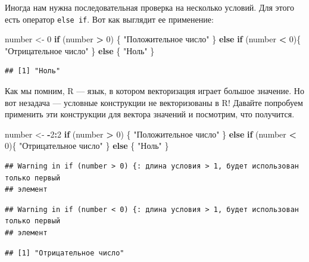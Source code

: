 \documentclass[]{book}
\newenvironment{Shaded}{\begin{snugshade}}{\end{snugshade}}
\newcommand{\DecValTok}[1]{\textcolor[rgb]{0.00,0.00,0.81}{#1}}
\newcommand{\StringTok}[1]{\textcolor[rgb]{0.31,0.60,0.02}{#1}}
\newcommand{\ControlFlowTok}[1]{\textcolor[rgb]{0.13,0.29,0.53}{\textbf{#1}}}
\newcommand{\OperatorTok}[1]{\textcolor[rgb]{0.81,0.36,0.00}{\textbf{#1}}}
\newcommand{\NormalTok}[1]{#1}
\begin{document}
Иногда нам нужна последовательная проверка на несколько условий. Для
этого есть оператор \texttt{else\ if}. Вот как выглядит ее применение:

\begin{Shaded}
\begin{Highlighting}[]
\NormalTok{number <-}\StringTok{ }\DecValTok{0}
\ControlFlowTok{if}\NormalTok{ (number }\OperatorTok{>}\StringTok{ }\DecValTok{0}\NormalTok{) \{}
  \StringTok{"Положительное число"}
\NormalTok{\} }\ControlFlowTok{else} \ControlFlowTok{if}\NormalTok{ (number }\OperatorTok{<}\StringTok{ }\DecValTok{0}\NormalTok{)\{}
  \StringTok{"Отрицательное число"}
\NormalTok{\} }\ControlFlowTok{else}\NormalTok{ \{}
  \StringTok{"Ноль"}
\NormalTok{\}}
\end{Highlighting}
\end{Shaded}

\begin{verbatim}
## [1] "Ноль"
\end{verbatim}

Как мы помним, R --- язык, в котором векторизация играет большое
значение. Но вот незадача --- условные конструкции не векторизованы в R!
Давайте попробуем применить эти конструкции для вектора значений и
посмотрим, что получится.

\begin{Shaded}
\begin{Highlighting}[]
\NormalTok{number <-}\StringTok{ }\OperatorTok{-}\DecValTok{2}\OperatorTok{:}\DecValTok{2}
\ControlFlowTok{if}\NormalTok{ (number }\OperatorTok{>}\StringTok{ }\DecValTok{0}\NormalTok{) \{}
  \StringTok{"Положительное число"}
\NormalTok{\} }\ControlFlowTok{else} \ControlFlowTok{if}\NormalTok{ (number }\OperatorTok{<}\StringTok{ }\DecValTok{0}\NormalTok{)\{}
  \StringTok{"Отрицательное число"}
\NormalTok{\} }\ControlFlowTok{else}\NormalTok{ \{}
  \StringTok{"Ноль"}
\NormalTok{\}}
\end{Highlighting}
\end{Shaded}

\begin{verbatim}
## Warning in if (number > 0) {: длина условия > 1, будет использован только первый
## элемент
\end{verbatim}

\begin{verbatim}
## Warning in if (number < 0) {: длина условия > 1, будет использован только первый
## элемент
\end{verbatim}

\begin{verbatim}
## [1] "Отрицательное число"
\end{verbatim}
\end{document}
